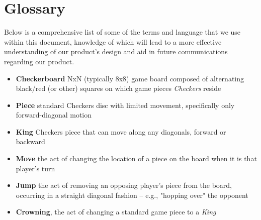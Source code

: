 \documentclass[letterpaper]{article}
\begin{document}

\newpage

\section{Glossary}
\label{sec:glossary}

Below is a comprehensive list of some of the terms and language
that we use within this document, knowledge of which will lead
to a more effective understanding of our product's design and
aid in future communications regarding our product.

\begin{itemize}
    \item \textbf{Checkerboard} NxN (typically 8x8) game board
          composed of alternating black/red (or other) squares
          on which game pieces \emph{Checkers} reside
    \item \textbf{Piece} standard Checkers disc with limited
          movement, specifically only forward-diagonal motion
    \item \textbf{King} Checkers piece that can move along any
          diagonals, forward or backward
    \item \textbf{Move} the act of changing the location of a
          piece on the board when it is that player's turn
    \item \textbf{Jump} the act of removing an opposing player's
          piece from the board, occurring in a straight diagonal
          fashion -- e.g., "hopping over" the opponent
    \item \textbf{Crowning}, the act of changing a standard
          game piece to a \emph{King}
\end{itemize}

\newpage


\renewcommand{\bibsection}{\section{\refname}} %
\end{document}
